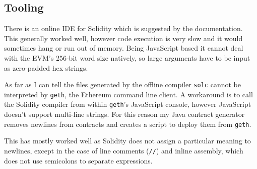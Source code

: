 \documentclass[12pt,a4paper,twoside,openright]{report}
\begin{document}

%

\subsection{Tooling}

There is an online IDE for Solidity\cite{browser-solidity} which is suggested by the documentation.
This generally worked well, however code execution is very slow and it would sometimes hang or run out of memory.
Being JavaScript based it cannot deal with the EVM's 256-bit word size natively, so large arguments have to be input as zero-padded hex strings.

As far as I can tell the files generated by the offline compiler \texttt{solc} cannot be interpreted by \texttt{geth}, the Ethereum command line client.
A workaround is to call the Solidity compiler from within \texttt{geth}'s JavaScript console,
however JavaScript doesn't support multi-line strings.
For this reason my Java contract generator removes newlines from contracts and creates a script to deploy them from \texttt{geth}.

This has mostly worked well as Solidity does not assign a particular meaning to newlines, except in the case of line comments (\texttt{//}) and inline assembly,
which does not use semicolons to separate expressions.
\end{document}
